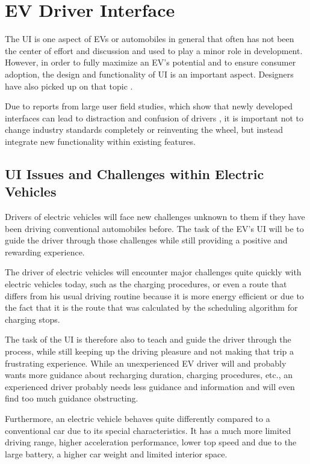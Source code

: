 \clearpage

\section{EV Driver Interface}

The UI is one aspect of EVs or automobiles in general that often has not been the center of effort and discussion and used to play a minor role in development. However, in order to fully maximize an EV's potential and to ensure consumer adoption, the design and functionality of UI is an important aspect. Designers have also picked up on that topic \cite{driver-1}.

Due to reports from large user field studies, which show that newly developed interfaces can lead to distraction and confusion of drivers \cite{driver-2} \cite{driver-3}, it is important not to change industry standards completely or reinventing the wheel, but instead integrate new functionality within existing features. 

\subsection{UI Issues and Challenges within Electric Vehicles}

Drivers of electric vehicles will face new challenges unknown to them if they have been driving conventional automobiles before. The task of the EV's UI will be to guide the driver through those challenges while still providing a positive and rewarding experience.

The driver of electric vehicles will encounter major challenges quite quickly with electric vehicles today, such as the charging procedures, or even a route that differs from his usual driving routine because it is more energy efficient or due to the fact that it is the route that was calculated by the scheduling algorithm for charging stops.

The task of the UI is therefore also to teach and guide the driver through the process, while still keeping up the driving pleasure and not making that trip a frustrating experience. While an unexperienced EV driver will and probably wants more guidance about recharging duration, charging procedures, etc., an experienced driver probably needs less guidance and information and will even find too much guidance obstructing.

Furthermore, an electric vehicle behaves quite differently compared to a conventional car due to its special characteristics. It has a much more limited driving range, higher acceleration performance, lower top speed and due to the large battery, a higher car weight and limited interior space.

